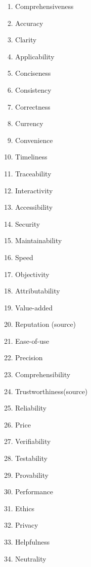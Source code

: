 \begin{figure}[htb]
    \begin{multicols}{3}
        \begin{enumerate}
            \item Comprehensiveness
            \item Accuracy
            \item Clarity
            \item Applicability
            \item Conciseness
            \item Consistency
            \item Correctness
            \item Currency
            \item Convenience
            \item Timeliness
            \item Traceability
            \item Interactivity
            \item Accessibility
            \item Security
            \item Maintainability
            \item Speed
            \item Objectivity
            \item Attributability
            \item Value-added
            \item Reputation (source)
            \item Ease-of-use
            \item Precision
            \item Comprehensibility
            \item Trustworthiness\newline (source)
            \item Reliability
            \item Price 
            \item Verifiability
            \item Testability
            \item Provability
            \item Performance
            \item Ethics
            \item Privacy
            \item Helpfulness
            \item Neutrality

\end{enumerate}
\end{multicols}
\end{figure}
